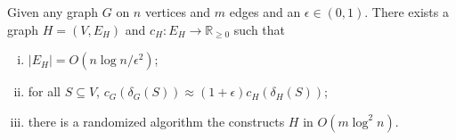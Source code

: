\begin{theorem}
	Given any graph \(G\) on \(n\) vertices and \(m\) edges and an \(\epsilon \in (0, 1)\). There exists a graph \(H = (V, E_{H})\) and \(c_H \colon E_H \to \mathbb{R} _{\geq 0}\) such that
	\begin{enumerate}[(i)]
		\item \(\lvert E_H \rvert = O(n \log n / \epsilon ^2)\);
		\item for all \(S \subseteq V\), \(c_G(\delta _G(S)) \approx (1 + \epsilon ) c_H(\delta _H(S))\);
		\item there is a randomized algorithm the constructs \(H\) in \(O(m \log ^2 n)\).
	\end{enumerate}
\end{theorem}